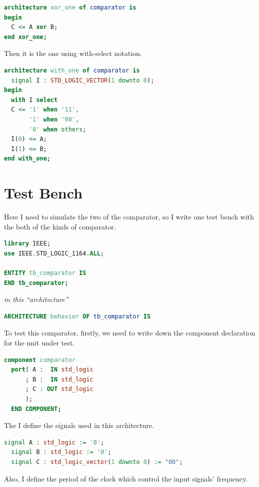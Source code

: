 \documentclass{article}
\begin{document}
\begin{lstlisting}[language=VHDL]
architecture xor_one of comparator is
begin
  C <= A xor B;
end xor_one;
\end{lstlisting}
    
    Then it is the one using with-select notation.

\begin{lstlisting}[language=VHDL]
architecture with_one of comparator is
  signal I : STD_LOGIC_VECTOR(1 downto 0);
begin
  with I select
  C <= '1' when '11',
       '1' when '00',
       '0' when others;
  I(0) <= A;
  I(1) <= B;
end with_one;
\end{lstlisting}



    \section{Test Bench}
    \label{sec:testbench}

    Here I need to simulate the two of the comparator, so I write one test bench with the both of the kinds of comparator.

\begin{lstlisting}[language=VHDL]
library IEEE;
use IEEE.STD_LOGIC_1164.ALL;
 
ENTITY tb_comparator IS
END tb_comparator;
\end{lstlisting}

    \textit{in this ``architecture''}
\begin{lstlisting}[language=VHDL]
ARCHITECTURE behavior OF tb_comparator IS 
\end{lstlisting}
    
    To test this comparator, firstly, we need to write down the component declaration for the unit under test.

\begin{lstlisting}[language=VHDL]
  component comparator
  port( A :  IN std_logic
      ; B :  IN std_logic
      ; C : OUT std_logic
      );
  END COMPONENT;
\end{lstlisting}

    The I define the signals used in this architecture. 

\begin{lstlisting}[language=VHDL]
  signal A : std_logic := '0';
  signal B : std_logic := '0';
  signal C : std_logic_vector(1 downto 0) := "00";
\end{lstlisting}

    Also, I define the period of the clock which control the input signals' frequency.
\end{document}

